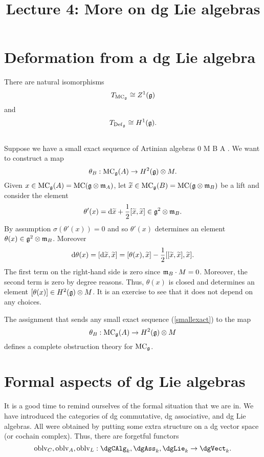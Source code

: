 \documentclass[11pt]{amsart}
\title{Lecture 4: More on dg Lie algebras}
\begin{document}
\section{Deformation from a dg Lie algebra}

\begin{prop}
There are natural isomorphisms
\[
T_{{\rm MC}_\mathfrak g} \cong Z^1(\mathfrak g)
\] 
and 
\[
T_{{\rm Def}_\mathfrak g} \cong H^1(\mathfrak g) .
\] 
\end{prop}

\subsection{}

Suppose we have a small exact sequence of Artinian algebras
\beqn\label{smallexact}
0 \to M \to B \xto{\sigma} A  .
\eeqn
We want to construct a map
\[
\theta_B : {\rm MC}_\mathfrak g(A) \to H^2(\mathfrak g) \otimes M .
\]
Given $x \in {\rm MC}_{\mathfrak g}(A) = {\rm MC}(\mathfrak g \otimes {\mathfrak m}_A)$, let $\widetilde{x} \in {\rm MC}_\mathfrak g(B) = {\rm MC}(\mathfrak g \otimes {\mathfrak m}_B)$ be a lift and consider the element 
\[
\theta'(x) = {\rm d} \widetilde{x} + \frac{1}{2}[\widetilde{x}, \widetilde{x}] \in \mathfrak g^2 \otimes {\mathfrak m}_B .
\] 
By assumption $\sigma(\theta'(x)) = 0$ and so $\theta'(x)$ determines an element $\theta(x) \in \mathfrak g^2 \otimes {\mathfrak m}_B$.
Moreover
\[
{\rm d} \theta(x) = [{\rm d} \widetilde{x}, \widetilde{x}] = [\theta(x), \widetilde{x}] - \frac{1}{2} [[\widetilde{x},\widetilde{x}],\widetilde{x}]  .
\]
The first term on the right-hand side is zero since ${\mathfrak m}_B \cdot M = 0$.
Moreover, the second term is zero by degree reasons. 
Thus, $\theta(x)$ is closed and determines an element $[\theta(x)] \in H^2(\mathfrak g) \otimes M$. 
It is an exercise to see that it does not depend on any choices. 

\begin{prop}
The assignment that sends any small exact sequence (\ref{smallexact}) to the map
\[
\theta_B : {\rm MC}_\mathfrak g(A) \to H^2(\mathfrak g) \otimes M
\]
defines a complete obstruction theory for ${\rm MC}_\mathfrak g$. 
\end{prop}

\section{Formal aspects of dg Lie algebras}

\def\oblv{{\rm oblv}}

It is a good time to remind ourselves of the formal situation that we are in. 
We have introduced the categories of dg commutative, dg associative, and dg Lie algebras.
All were obtained by putting some extra structure on a dg vector space (or cochain complex).
Thus, there are forgetful functors
\[
\oblv_{C}, \oblv_{A}, \oblv_L : \dgCAlg_k, \dgAss_k, \dgLie_k \to \dgVect_k .
\] 
\end{document}
